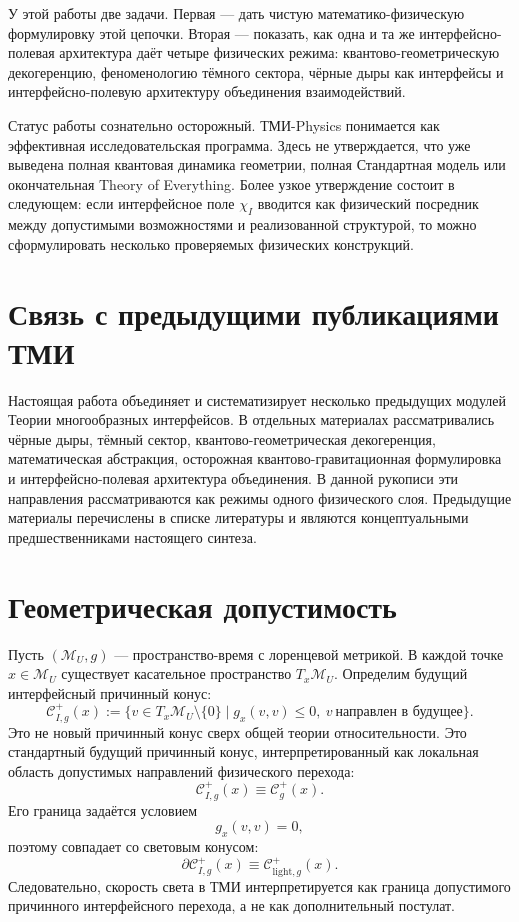 \documentclass[12pt,a4paper]{article}
\newcommand{\M}{\mathcal M_U}
\begin{document}
У этой работы две задачи. Первая — дать чистую математико-физическую формулировку этой цепочки. Вторая — показать, как одна и та же интерфейсно-полевая архитектура даёт четыре физических режима: квантово-геометрическую декогеренцию, феноменологию тёмного сектора, чёрные дыры как интерфейсы и интерфейсно-полевую архитектуру объединения взаимодействий.

Статус работы сознательно осторожный. ТМИ-Physics понимается как эффективная исследовательская программа. Здесь не утверждается, что уже выведена полная квантовая динамика геометрии, полная Стандартная модель или окончательная Theory of Everything. Более узкое утверждение состоит в следующем: если интерфейсное поле $\chi_I$ вводится как физический посредник между допустимыми возможностями и реализованной структурой, то можно сформулировать несколько проверяемых физических конструкций.

\section{Связь с предыдущими публикациями ТМИ}
Настоящая работа объединяет и систематизирует несколько предыдущих модулей Теории многообразных интерфейсов. В отдельных материалах рассматривались чёрные дыры, тёмный сектор, квантово-геометрическая декогеренция, математическая абстракция, осторожная квантово-гравитационная формулировка и интерфейсно-полевая архитектура объединения. В данной рукописи эти направления рассматриваются как режимы одного физического слоя. Предыдущие материалы перечислены в списке литературы и являются концептуальными предшественниками настоящего синтеза.

\section{Геометрическая допустимость}
Пусть $(\M,g)$ — пространство-время с лоренцевой метрикой. В каждой точке $x\in\M$ существует касательное пространство $T_x\M$. Определим будущий интерфейсный причинный конус:
\[
\boxed{
\mathcal C^{+}_{I,g}(x):=
\{v\in T_x\M\setminus\{0\}\mid g_x(v,v)\leq0,\ v\ \text{направлен в будущее}\}.
}
\]
Это не новый причинный конус сверх общей теории относительности. Это стандартный будущий причинный конус, интерпретированный как локальная область допустимых направлений физического перехода:
\[
\mathcal C^{+}_{I,g}(x)\equiv \mathcal C^{+}_{g}(x).
\]
Его граница задаётся условием
\[
g_x(v,v)=0,
\]
поэтому совпадает со световым конусом:
\[
\boxed{\partial\mathcal C^{+}_{I,g}(x)\equiv \mathcal C^{+}_{\mathrm{light},g}(x).}
\]
Следовательно, скорость света в ТМИ интерпретируется как граница допустимого причинного интерфейсного перехода, а не как дополнительный постулат.
\end{document}
